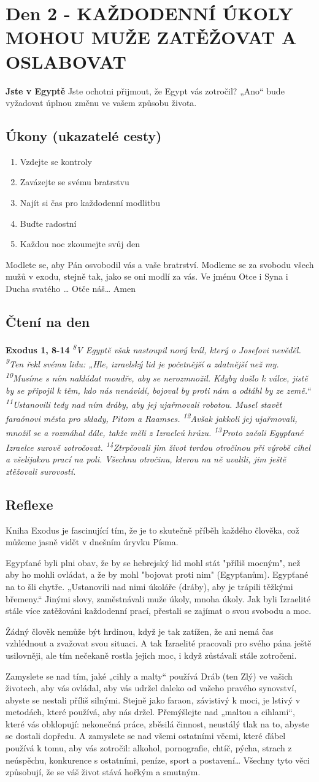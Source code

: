 \documentclass[11pt]{article}
\newcommand{\zacatekPrvniTyden}{
  \textbf{Jste v Egyptě} \newline
  Jste ochotni přijmout, že Egypt vás zotročil? „Ano“ bude vyžadovat úplnou změnu ve vašem způsobu života.

\subsection*{Úkony (ukazatelé cesty)}
\begin{enumerate}
  \item Vzdejte se kontroly
  \item Zavázejte se svému bratrstvu
  \item Najít si čas pro každodenní modlitbu
  \item Buďte radostní
  \item Každou noc zkoumejte svůj den
\end{enumerate}
Modlete se, aby Pán osvobodil vás a vaše bratrství. \newline
Modleme se za svobodu všech mužů v exodu, stejně tak, jako se oni modlí za vás.\newline
Ve jménu Otce i Syna i Ducha svatého …  Otče náš… Amen
}
\begin{document}
\newpage
\section{Den 2 - KAŽDODENNÍ ÚKOLY MOHOU MUŽE ZATĚŽOVAT A OSLABOVAT}
\zacatekPrvniTyden
\subsection*{Čtení na den}
\textbf{Exodus 1, 8-14}
\newline
\textit{
\textsuperscript{8}V Egyptě však nastoupil nový král, který o Josefovi nevěděl.
\textsuperscript{9}Ten řekl svému lidu: „Hle, izraelský lid je početnější a zdatnější než my.
\textsuperscript{10}Musíme s ním nakládat moudře, aby se nerozmnožil. Kdyby došlo k válce, jistě by se připojil k těm, kdo nás nenávidí, bojoval by proti nám a odtáhl by ze země.“
\textsuperscript{11}Ustanovili tedy nad ním dráby, aby jej ujařmovali robotou. Musel stavět faraónovi města pro sklady, Pitom a Raamses.
\textsuperscript{12}Avšak jakkoli jej ujařmovali, množil se a rozmáhal dále, takže měli z Izraelců hrůzu.
\textsuperscript{13}Proto začali Egypťané Izraelce surově zotročovat.
\textsuperscript{14}Ztrpčovali jim život tvrdou otročinou při výrobě cihel a všelijakou prací na poli. Všechnu otročinu, kterou na ně uvalili, jim ještě ztěžovali surovostí.  
}\subsection*{Reflexe}
Kniha Exodus je fascinující tím, že je to skutečně příběh každého člověka, což můžeme jasně vidět v dnešním úryvku Písma.

Egypťané byli plni obav, že by se hebrejský lid mohl stát "příliš mocným", než aby ho mohli ovládat, a že by mohl "bojovat proti nim" (Egypťanům). Egypťané na to šli chytře. „Ustanovili nad nimi úkoláře (dráby), aby je trápili těžkými břemeny.“ Jinými slovy, zaměstnávali muže úkoly, mnoha úkoly.
Jak byli Izraelité stále více zatěžováni každodenní prací, přestali se zajímat o svou svobodu a moc.

Žádný člověk nemůže být hrdinou, když je tak zatížen, že ani nemá čas vzhlédnout a zvažovat svou situaci. A tak Izraelité pracovali pro svého pána ještě usilovněji, ale tím nečekaně rostla jejich moc, i když zůstávali stále zotročeni.

Zamyslete se nad tím, jaké „cihly a malty“ používá Dráb (ten Zlý) ve vašich životech, aby vás ovládal, aby vás udržel daleko od vašeho pravého synovství, abyste se nestali příliš silnými. Stejně jako faraon, závistivý k moci, je lstivý v metodách, které používá, aby nás držel.
Přemýšlejte nad „maltou a cihlami“, které vás obklopují: nekonečná práce, zběsilá činnost, neustálý tlak na to, abyste se dostali dopředu. A zamyslete se nad všemi ostatními věcmi, které ďábel používá k tomu, aby vás zotročil: alkohol, pornografie, chtíč, pýcha, strach z neúspěchu, konkurence s ostatními, peníze, sport a postavení… Všechny tyto věci způsobují, že se váš život stává hořkým a smutným.
\end{document}
